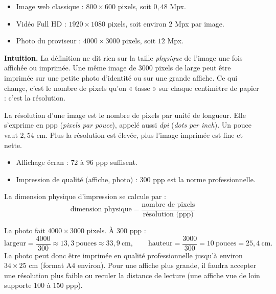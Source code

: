 \documentclass[11pt]{article}
\newcommand{\cle}[1]{{\popxbold\color{popdark}#1}}
\newcounter{popsec}
\newcounter{popsub}
\newcommand{\courssub}[1]{%
  \stepcounter{popsub}%
  \par\vspace{9pt}\noindent{\popxbold\fontsize{11.5}{13}\selectfont\color{popink}{\color{poporange}\thepopsec.\thepopsub}\hspace{6pt}#1}\par\nopagebreak\vspace{4pt}
}
\begin{document}
\begin{exemplebox}
\begin{itemize}
  \item Image web classique : $800 \times 600$ pixels, soit $0,48$ Mpx.
  \item Vidéo Full HD : $1920 \times 1080$ pixels, soit environ $2$ Mpx par image.
  \item Photo du proviseur : $4000 \times 3000$ pixels, soit $12$ Mpx.
\end{itemize}
\end{exemplebox}

\courssub{La résolution d'une image}

\textbf{Intuition.} La définition ne dit rien sur la taille \emph{physique} de l'image une fois affichée ou imprimée. Une même image de $3000$ pixels de large peut être imprimée sur une petite photo d'identité ou sur une grande affiche. Ce qui change, c'est le nombre de pixels qu'on « tasse » sur chaque centimètre de papier : c'est la résolution.

\begin{definition}[Résolution]
La \cle{résolution} d'une image est le nombre de pixels par unité de longueur. Elle s'exprime en \cle{ppp} (\emph{pixels par pouce}), appelé aussi \emph{dpi} (\emph{dots per inch}). Un pouce vaut $2,54$ cm. Plus la résolution est élevée, plus l'image imprimée est fine et nette.
\end{definition}

\begin{aretenir}
\begin{itemize}
  \item Affichage écran : $72$ à $96$ ppp suffisent.
  \item Impression de qualité (affiche, photo) : $300$ ppp est la norme professionnelle.
\end{itemize}
La dimension physique d'impression se calcule par :
\[ \text{dimension physique} = \frac{\text{nombre de pixels}}{\text{résolution (ppp)}} \]
\end{aretenir}

\begin{exemplebox}
La photo fait $4000 \times 3000$ pixels. À $300$ ppp :
\[ \text{largeur} = \frac{4000}{300} \approx 13,3~\text{pouces} \approx 33,9~\text{cm}, \qquad \text{hauteur} = \frac{3000}{300} = 10~\text{pouces} = 25,4~\text{cm}. \]
La photo peut donc être imprimée en qualité professionnelle jusqu'à environ $34 \times 25$ cm (format A4 environ). Pour une affiche plus grande, il faudra accepter une résolution plus faible ou reculer la distance de lecture (une affiche vue de loin supporte $100$ à $150$ ppp).
\end{exemplebox}
\end{document}
